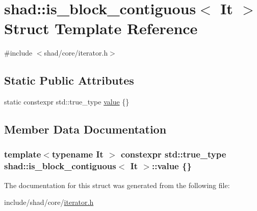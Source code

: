 \hypertarget{structshad_1_1is__block__contiguous}{\section{shad\-:\-:is\-\_\-block\-\_\-contiguous$<$ It $>$ Struct Template Reference}
\label{structshad_1_1is__block__contiguous}
}


{\ttfamily \#include $<$shad/core/iterator.\-h$>$}

\subsection*{Static Public Attributes}
\begin{DoxyCompactItemize}
\item 
static constexpr std\-::true\-\_\-type \hyperlink{structshad_1_1is__block__contiguous_a3a6d6b8fadc20fcf7d737de0b9a1f567}{value} \{\}
\end{DoxyCompactItemize}


\subsection{Member Data Documentation}
\hypertarget{structshad_1_1is__block__contiguous_a3a6d6b8fadc20fcf7d737de0b9a1f567}{
\subsubsection[{value}]{\setlength{\rightskip}{0pt plus 5cm}template$<$typename It $>$ constexpr std\-::true\-\_\-type {\bf shad\-::is\-\_\-block\-\_\-contiguous}$<$ It $>$\-::value \{\}\hspace{0.3cm}{\ttfamily [static]}}}\label{structshad_1_1is__block__contiguous_a3a6d6b8fadc20fcf7d737de0b9a1f567}


The documentation for this struct was generated from the following file\-:\begin{DoxyCompactItemize}
\item 
include/shad/core/\hyperlink{iterator_8h}{iterator.\-h}\end{DoxyCompactItemize}
